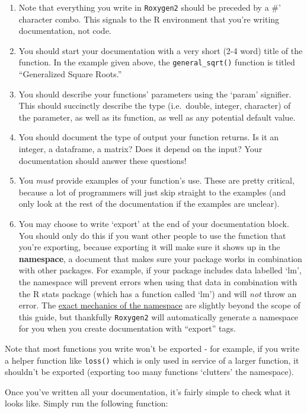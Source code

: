 \documentclass[
]{book}
\begin{document}
\begin{enumerate}
\def\labelenumi{\arabic{enumi}.}
\item
  Note that everything you write in \texttt{Roxygen2} should be preceded by a \#' character combo. This signals to the R environment that you're writing documentation, not code.
\item
  You should start your documentation with a very short (2-4 word) title of the function. In the example given above, the \texttt{general\_sqrt()} function is titled ``Generalized Square Roots.''
\item
  You should describe your functions' parameters using the `param' signifier. This should succinctly describe the type (i.e.~double, integer, character) of the parameter, as well as its function, as well as any potential default value.
\item
  You should document the type of output your function returns. Is it an integer, a dataframe, a matrix? Does it depend on the input? Your documentation should answer these questions!
\item
  You \emph{must} provide examples of your function's use. These are pretty critical, because a lot of programmers will just skip straight to the examples (and only look at the rest of the documentation if the examples are unclear).
\item
  You may choose to write `export' at the end of your documentation block. You should only do this if you want other people to use the function that you're exporting, because exporting it will make sure it shows up in the \textbf{namespace}, a document that makes sure your package works in combination with other packages. For example, if your package includes data labelled `lm', the namespace will prevent errors when using that data in combination with the R stats package (which has a function called `lm') and will \emph{not} throw an error. The \href{http://r-pkgs.had.co.nz/namespace.html}{exact mechanics of the namespace} are slightly beyond the scope of this guide, but thankfully \texttt{Roxygen2} will automatically generate a namespace for you when you create documentation with ``export'' tags.
\end{enumerate}

Note that most functions you write won't be exported - for example, if you write a helper function like \texttt{loss()} which is only used in service of a larger function, it shouldn't be exported (exporting too many functions `clutters' the namespace).

Once you've written all your documentation, it's fairly simple to check what it looks like. Simply run the following function:
\end{document}
